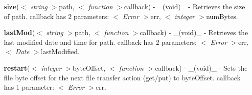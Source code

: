 \begin{DoxyItemize}
\item {\bfseries size}($<$ {\itshape string} $>$path, $<$ {\itshape function} $>$callback) -\/ \+\_\+(void)\+\_\+ -\/ Retrieves the size of {\ttfamily path}. {\ttfamily callback} has 2 parameters\+: $<$ {\itshape Error} $>$err, $<$ {\itshape integer} $>$num\+Bytes.
\item {\bfseries last\+Mod}($<$ {\itshape string} $>$path, $<$ {\itshape function} $>$callback) -\/ \+\_\+(void)\+\_\+ -\/ Retrieves the last modified date and time for {\ttfamily path}. {\ttfamily callback} has 2 parameters\+: $<$ {\itshape Error} $>$err, $<$ {\itshape Date} $>$last\+Modified.
\item {\bfseries restart}($<$ {\itshape integer} $>$byte\+Offset, $<$ {\itshape function} $>$callback) -\/ \+\_\+(void)\+\_\+ -\/ Sets the file byte offset for the next file transfer action (get/put) to {\ttfamily byte\+Offset}. {\ttfamily callback} has 1 parameter\+: $<$ {\itshape Error} $>$err. 
\end{DoxyItemize}
